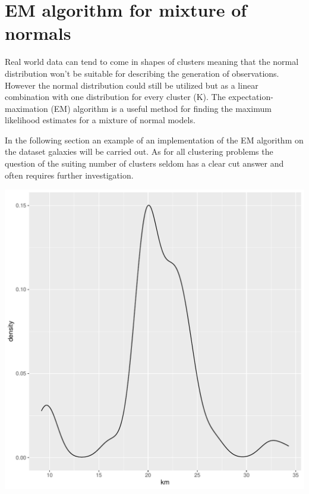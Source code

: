 \documentclass{article}\usepackage[]{graphicx}\usepackage[]{color}
\makeatletter
\def\maxwidth{ %
  \ifdim\Gin@nat@width>\linewidth
    \linewidth
  \else
    \Gin@nat@width
  \fi
}
\newenvironment{knitrout}{}{} %
\makeatother
\begin{document}
\pagebreak

\section{EM algorithm for mixture of normals}

Real world data can tend to come in shapes of clusters meaning that the normal distribution won’t be suitable for describing the generation of observations. However the normal distribution could still be utilized but as a linear combination with one distribution for every cluster (K). The expectation-maximation (EM) algorithm is a useful method for finding the maximum likelihood estimates for a mixture of normal models.

In the following section an example of an implementation of the EM algorithm on the dataset galaxies will be carried out. As for all clustering problems the question of the suiting number of clusters seldom has a clear cut answer and often requires further investigation. 

\begin{knitrout}
\color{fgcolor}
\includegraphics[width=\maxwidth]{figure/unnamed-chunk-7-1} 

\end{knitrout}
\end{document}
